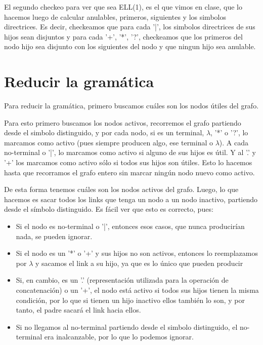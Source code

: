 \documentclass[a4paper]{report}
\begin{document}
El segundo checkeo para ver que sea ELL(1), es el que vimos en clase, que lo
hacemos luego de calcular anulables, primeros, siguientes y los simbolos
directrices. Es decir, checkeamos que para cada '|', los simbolos directrices de
sus hijos sean disjuntos y para cada '+', '*', '?', checkeamos que los primeros
del nodo hijo sea disjunto con los siguientes del nodo y que ningun hijo sea
anulable.


\section*{Reducir la gramática}

	Para reducir la gramática, primero buscamos cuáles son los nodos útiles
del grafo.


	Para esto primero buscamos los nodos activos, recorremos el grafo partiendo desde el
simbolo distinguido, y por cada nodo, si es un terminal, $\lambda$, '*' o '?', lo
marcamos como activo (pues siempre producen algo, ese terminal o $\lambda$). A cada
no-terminal o '|', lo marcamos como activo si alguno de sus hijos es útil. Y al
'.' y '+' los marcamos como activo sólo si todos sus hijos son útiles. Esto lo
hacemos hasta que recorramos el grafo entero sin marcar ningún nodo nuevo como activo.


	De esta forma tenemos cuáles son los nodos activos del grafo. Luego, lo
que hacemos es sacar todos los links que tenga un nodo a un nodo inactivo,
partiendo desde el símbolo distinguido. Es fácil ver que esto es correcto, pues:


\begin{itemize}
\item Si el nodo es no-terminal o '|', entonces esos casos, que nunca producirían nada,
se pueden ignorar.

\item Si el nodo es un '*' o '+' y sus hijos no son activos,
entonces lo reemplazamos por $\lambda$ y sacamos el link a su hijo, ya que es lo
único que pueden producir 

\item Si, en cambio, es un '.' (representación utilizada para la operación de concatenación) o un '+', el nodo está activo si todos sus hijos tienen la misma condición, por lo que si tienen un hijo inactivo ellos también lo son, y por tanto, el padre sacará el link hacia ellos. 
\item Si no llegamos al no-terminal partiendo desde el simbolo distinguido, el no-terminal era inalcanzable, por lo que lo podemos ignorar.
\end{itemize}
\end{document}
